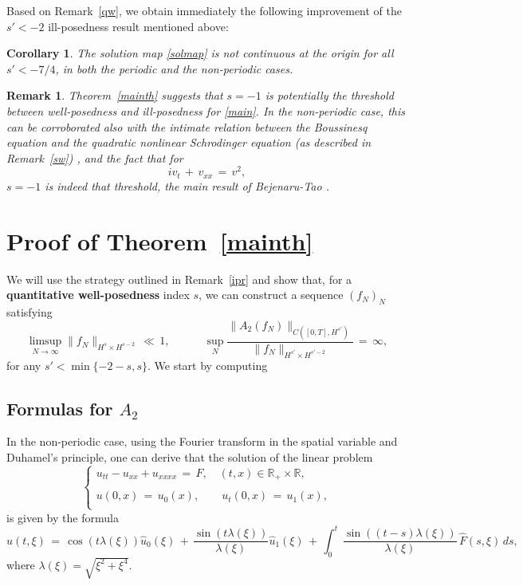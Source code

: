 \documentclass{amsart}
\newtheorem{corollary}[theorem]{Corollary}
\newtheorem{remark}[theorem]{Remark}
\begin{document}
Based on Remark~\ref{qw}, we obtain immediately the following improvement of the $s'<-2$ ill-posedness result mentioned above:

\begin{corollary}
The solution map \eqref{solmap} is not continuous at the origin for all $s'<-7/4$, in both the periodic and the non-periodic cases.
\end{corollary}

\begin{remark}
Theorem~\ref{mainth} suggests that $s=-1$ is potentially the threshold between well-posedness and ill-posedness for \eqref{main}.  In the non-periodic case, this can be corroborated also with the intimate relation between the Boussinesq equation and the quadratic nonlinear Schrodinger equation (as described in Remark~\ref{sw}) , and the fact that for 
\[
iv_t\,+\,v_{xx}\,=\,v^2,
\]
$s=-1$ is indeed that threshold, the main result of Bejenaru-Tao \cite{BT06}. 
\end{remark}


\section{Proof of Theorem~\ref{mainth}}
We will use the strategy outlined in Remark~\ref{ipr} and show that, for a \textbf{quantitative well-posedness}  index $s$, we can construct a sequence $(f_N)_N$ satisfying
\[
\limsup_{N\to \infty} \|f_N\|_{H^s \times H^{s-2}}\,\ll\,1, \qquad \quad \sup_N \frac{\|A_2(f_N)\|_{C([0,T],H^{s'})}}{\|f_N\|_{H^{s'} \times H^{s'-2}}}\,=\,\infty,\]
for any $s'< \min\{-2-s, s\}$. We start by computing


\subsection{Formulas for $A_2$} In the non-periodic case, using the Fourier transform in the spatial variable and Duhamel's principle, one can derive that the solution of the linear problem
\begin{equation}
\left\{
\begin{array}{l}
u_{tt}-u_{xx}+u_{xxxx}\,=\,F, \quad (t,x)\in \mathbb{R}_+\times\mathbb{R},\\
\\
u(0,x)\,=\,u_0(x),\qquad u_t(0,x)\,=\,u_1(x),\\
\end{array}\right.
\label{hom}
\end{equation}
is given by the formula
\begin{equation}
\hat{u}(t,\xi)\,=\,\cos(t \lambda(\xi)) \hat{u}_0(\xi)\,+\,\frac{\sin(t \lambda(\xi))}{\lambda(\xi)} \hat{u}_1(\xi)\,+\,\int_0^t\,\frac{\sin((t-s) \lambda(\xi))}{\lambda(\xi)} \,\hat{F}(s,\xi)\,ds,
\label{lin}\end{equation}
where $\lambda(\xi)=\sqrt{\xi^2+\xi^4}$. 
\end{document}
